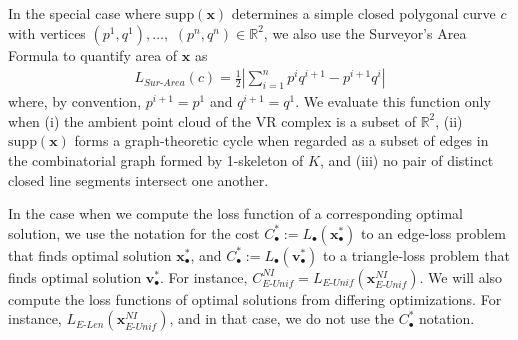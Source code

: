 \documentclass[11pt,onecolumn]{article}
\newcommand{\R}{\mathbb{R}}
\newcommand{\optimalrep}{\mathbf{x}}
\newcommand{\tab}{Table }
\newcommand{\se}{Section }
\newcommand{\volvec}{\mathbf{v}}
\newcommand{\supp}{\mathrm{supp}}
\newcommand{\NI}{^{NI}}
\newcommand{\EU}{_{E\text{-}Unif}}
\newcommand{\EL}{_{E\text{-}Len}}
\theoremstyle{plain}
\theoremstyle{definition}
\newcommand{\LL}[1]{{\textcolor{blue!50}{\small {\sf [[LL: #1]]}}}}
\begin{document}
In the special case where $\supp(\optimalrep)$ determines a simple closed polygonal curve $c$ with vertices $(p^1, q^1), \ldots,$ $(p^n, q^n) \in \R^2$, we also use the Surveyor's Area Formula \cite{TheSurveyorsAreaFormula}  to quantify area of $\optimalrep$ as  
    \begin{align*}
    \textstyle
    L_{Sur\text{-}Area}(c)
    =
    \frac{1}{2}
    \left  |
        \sum_{i=1}^{n} p^i q^{i+1} - 
        p^{i+1} q^{i}
    \right |
    \end{align*}
where, by convention, $p^{i+1} = p^1$ and $q^{i+1} =  q^1$. We evaluate this function only when (i) the ambient point cloud of the VR complex is a subset of $\R^2$, (ii) $\supp(\optimalrep)$ forms a graph-theoretic cycle when regarded as a subset of edges in the combinatorial graph formed by 1-skeleton of $K$, and (iii) no pair of distinct closed line segments intersect one another.


In the case when we compute the loss function of a corresponding optimal solution, we use the notation for the cost $C_\bullet^* := L_\bullet(\optimalrep_\bullet^*)$ to an edge-loss problem that finds optimal solution $\optimalrep_\bullet^*$, and $C_\bullet^* := L_\bullet(\volvec_\bullet^*)$ to a triangle-loss problem that finds optimal solution $\volvec_\bullet^*$. For instance, $C\EU\NI=L\EU(\optimalrep\EU\NI)$. We will also compute the loss functions of optimal solutions from differing optimizations. For instance, $L\EL(\optimalrep\EU\NI)$, and in that case, we do not use the $C_\bullet^*$ notation.











\end{document}
